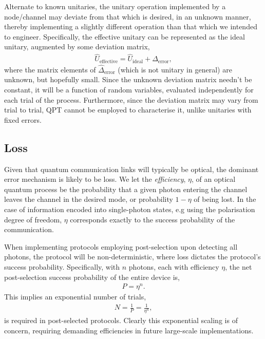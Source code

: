 Alternate to known unitaries, the unitary operation implemented by a node/channel may deviate from that which is desired, in an unknown manner, thereby implementing a slightly different operation than that which we intended to engineer. Specifically, the effective unitary can be represented as the ideal unitary, augmented by some deviation matrix,
\begin{align}
	\hat{U}_\mathrm{effective} = \hat{U}_\mathrm{ideal} + \hat{\Delta}_\mathrm{error},
\end{align}
where the matrix elements of $\hat{\Delta}_\mathrm{error}$ (which is not unitary in general) are unknown, but hopefully small. Since the unknown deviation matrix needn't be constant, it will be a function of random variables, evaluated independently for each trial of the process. Furthermore, since the deviation matrix may vary from trial to trial, QPT cannot be employed to characterise it, unlike unitaries with fixed errors.

%
%

\subsection{Loss} \label{sec:eff_err} 

Given that quantum communication links will typically be optical, the dominant error mechanism is likely to be loss. We let the \textit{efficiency}, $\eta$, of an optical quantum process be the probability that a given photon entering the channel leaves the channel in the desired mode, or probability \mbox{$1-\eta$} of being lost. In the case of information encoded into single-photon states, e.g using the polarisation degree of freedom, $\eta$ corresponds exactly to the success probability of the communication.

When implementing protocols employing post-selection upon detecting all photons, the protocol will be non-deterministic, where loss dictates the protocol's success probability. Specifically, with $n$ photons, each with efficiency $\eta$, the net post-selection success probability of the entire device is,
\begin{align}
	P=\eta^n.
\end{align}
This implies an exponential number of trials,
\begin{align}
	N = \frac{1}{P} = \frac{1}{\eta^n},
\end{align}
is required in post-selected protocols. Clearly this exponential scaling is of concern, requiring demanding efficiencies in future large-scale implementations.


